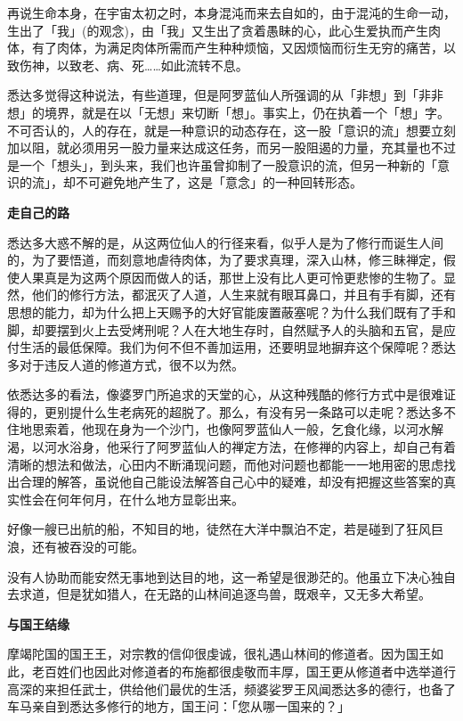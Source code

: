 \documentclass[12pt,twoside,openany]{book}
\newcommand{\mt}[1]{\textbullet \textbf{#1}}
\begin{document}
再说生命本身，在宇宙太初之时，本身混沌而来去自如的，由于混沌的生命一动，生出了「我」(的观念)，由「我」又生出了贪着愚眛的心，此心生爱执而产生肉体，有了肉体，为满足肉体所需而产生种种烦恼，又因烦恼而衍生无穷的痛苦，以致伤神，以致老、病、死……如此流转不息。

悉达多觉得这种说法，有些道理，但是阿罗蓝仙人所强调的从「非想」到「非非想」的境界，就是在以「无想」来切断「想」。事实上，仍在执着一个「想」字。不可否认的，人的存在，就是一种意识的动态存在，这一股「意识的流」想要立刻加以阻，就必须用另一股力量来达成这任务，而另一股阻遏的力量，充其量也不过是一个「想头」，到头来，我们也许虽曾抑制了一股意识的流，但另一种新的「意识的流」，却不可避免地产生了，这是「意念」的一种回转形态。

\mt{走自己的路}

悉达多大惑不解的是，从这两位仙人的行径来看，似乎人是为了修行而诞生人间的，为了要悟道，而刻意地虐待肉体，为了要求真理，深入山林，修三眛禅定，假使人果真是为这两个原因而做人的话，那世上没有比人更可怜更悲惨的生物了。显然，他们的修行方法，都泯灭了人道，人生来就有眼耳鼻口，并且有手有脚，还有思想的能力，却为什么把上天赐予的大好官能废置蔽塞呢？为什么我们既有了手和脚，却要摆到火上去受烤刑呢？人在大地生存时，自然赋予人的头脑和五官，是应付生活的最低保障。我们为何不但不善加运用，还要明显地摒弃这个保障呢？悉达多对于违反人道的修道方式，很不以为然。

依悉达多的看法，像婆罗门所追求的天堂的心，从这种残酷的修行方式中是很难证得的，更别提什么生老病死的超脱了。那么，有没有另一条路可以走呢？悉达多不住地思索着，他现在身为一个沙门，也像阿罗蓝仙人一般，乞食化缘，以河水解渴，以河水浴身，他采行了阿罗蓝仙人的禅定方法，在修禅的内容上，却自己有着清晰的想法和做法，心田内不断涌现问题，而他对问题也都能一一地用密的思虑找出合理的解答，虽说他自己能设法解答自己心中的疑难，却没有把握这些答案的真实性会在何年何月，在什么地方显彰出来。

好像一艘已出航的船，不知目的地，徒然在大洋中飘泊不定，若是碰到了狂风巨浪，还有被吞没的可能。

没有人协助而能安然无事地到达目的地，这一希望是很渺茫的。他虽立下决心独自去求道，但是犹如猎人，在无路的山林间追逐鸟兽，既艰辛，又无多大希望。

\mt{与国王结缘}

摩竭陀国的国王王，对宗教的信仰很虔诚，很礼遇山林间的修道者。因为国王如此，老百姓们也因此对修道者的布施都很虔敬而丰厚，国王更从修道者中选举道行高深的来担任武士，供给他们最优的生活，频婆娑罗王风闻悉达多的德行，也备了车马亲自到悉达多修行的地方，国王问：「您从哪一国来的？」
\end{document}
